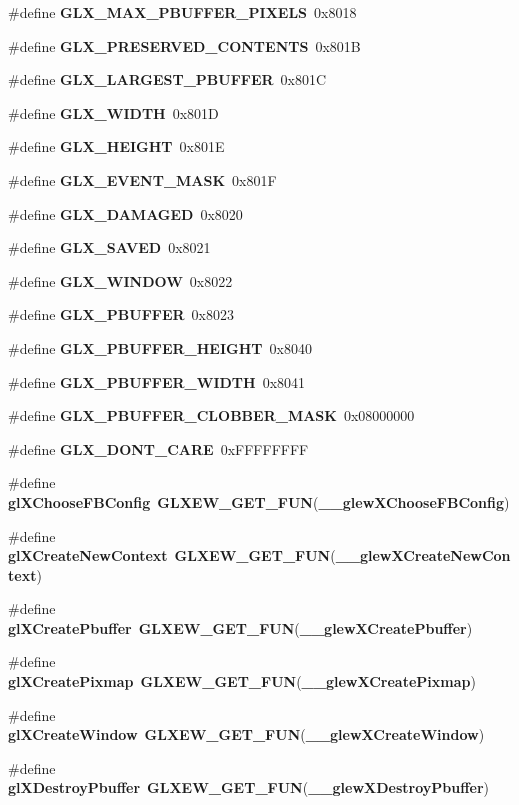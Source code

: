 \begin{DoxyCompactItemize}
\item 
\#define {\bf G\+L\+X\+\_\+\+M\+A\+X\+\_\+\+P\+B\+U\+F\+F\+E\+R\+\_\+\+P\+I\+X\+E\+LS}~0x8018
\item 
\#define {\bf G\+L\+X\+\_\+\+P\+R\+E\+S\+E\+R\+V\+E\+D\+\_\+\+C\+O\+N\+T\+E\+N\+TS}~0x801B
\item 
\#define {\bf G\+L\+X\+\_\+\+L\+A\+R\+G\+E\+S\+T\+\_\+\+P\+B\+U\+F\+F\+ER}~0x801C
\item 
\#define {\bf G\+L\+X\+\_\+\+W\+I\+D\+TH}~0x801D
\item 
\#define {\bf G\+L\+X\+\_\+\+H\+E\+I\+G\+HT}~0x801E
\item 
\#define {\bf G\+L\+X\+\_\+\+E\+V\+E\+N\+T\+\_\+\+M\+A\+SK}~0x801F
\item 
\#define {\bf G\+L\+X\+\_\+\+D\+A\+M\+A\+G\+ED}~0x8020
\item 
\#define {\bf G\+L\+X\+\_\+\+S\+A\+V\+ED}~0x8021
\item 
\#define {\bf G\+L\+X\+\_\+\+W\+I\+N\+D\+OW}~0x8022
\item 
\#define {\bf G\+L\+X\+\_\+\+P\+B\+U\+F\+F\+ER}~0x8023
\item 
\#define {\bf G\+L\+X\+\_\+\+P\+B\+U\+F\+F\+E\+R\+\_\+\+H\+E\+I\+G\+HT}~0x8040
\item 
\#define {\bf G\+L\+X\+\_\+\+P\+B\+U\+F\+F\+E\+R\+\_\+\+W\+I\+D\+TH}~0x8041
\item 
\#define {\bf G\+L\+X\+\_\+\+P\+B\+U\+F\+F\+E\+R\+\_\+\+C\+L\+O\+B\+B\+E\+R\+\_\+\+M\+A\+SK}~0x08000000
\item 
\#define {\bf G\+L\+X\+\_\+\+D\+O\+N\+T\+\_\+\+C\+A\+RE}~0x\+F\+F\+F\+F\+F\+F\+FF
\item 
\#define {\bf gl\+X\+Choose\+F\+B\+Config}~{\bf G\+L\+X\+E\+W\+\_\+\+G\+E\+T\+\_\+\+F\+UN}({\bf \+\_\+\+\_\+glew\+X\+Choose\+F\+B\+Config})
\item 
\#define {\bf gl\+X\+Create\+New\+Context}~{\bf G\+L\+X\+E\+W\+\_\+\+G\+E\+T\+\_\+\+F\+UN}({\bf \+\_\+\+\_\+glew\+X\+Create\+New\+Context})
\item 
\#define {\bf gl\+X\+Create\+Pbuffer}~{\bf G\+L\+X\+E\+W\+\_\+\+G\+E\+T\+\_\+\+F\+UN}({\bf \+\_\+\+\_\+glew\+X\+Create\+Pbuffer})
\item 
\#define {\bf gl\+X\+Create\+Pixmap}~{\bf G\+L\+X\+E\+W\+\_\+\+G\+E\+T\+\_\+\+F\+UN}({\bf \+\_\+\+\_\+glew\+X\+Create\+Pixmap})
\item 
\#define {\bf gl\+X\+Create\+Window}~{\bf G\+L\+X\+E\+W\+\_\+\+G\+E\+T\+\_\+\+F\+UN}({\bf \+\_\+\+\_\+glew\+X\+Create\+Window})
\item 
\#define {\bf gl\+X\+Destroy\+Pbuffer}~{\bf G\+L\+X\+E\+W\+\_\+\+G\+E\+T\+\_\+\+F\+UN}({\bf \+\_\+\+\_\+glew\+X\+Destroy\+Pbuffer})

\end{DoxyCompactItemize}
